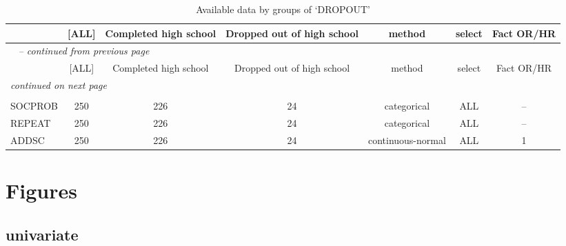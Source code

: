 \documentclass[a4paper,titlepage,12pt]{article}
\begin{document}
    \begin{longtable}{lcccccc}\caption{Available data by groups of `DROPOUT'}\\
    \hline  
     & [ALL] & Completed high school & Dropped out of high school &      method       & select & Fact OR/HR \\ 
 
    \hline 
    \hline  
    \endfirsthead 
    \multicolumn{7}{l}{\tablename\ \thetable{} \textit{-- continued from previous page}}\\ 
    \hline
     & [ALL] & Completed high school & Dropped out of high school &      method       & select & Fact OR/HR \\ 
 
    \hline
    \hline 
    \endhead   
    \hline
    \multicolumn{7}{l}{\textit{continued on next page}} \\ 
    \endfoot    
    \multicolumn{7}{l}{}  \\ 
    \endlastfoot 
    SOCPROB &  250  &          226          &             24             &    categorical    &  ALL   &     --    \\ 
REPEAT &  250  &          226          &             24             &    categorical    &  ALL   &     --    \\ 
ADDSC &  250  &          226          &             24             & continuous-normal &  ALL   &     1      \\ 

    \hline
    \end{longtable}
  \section{Figures}
  \subsection{univariate}
  
\end{document}
